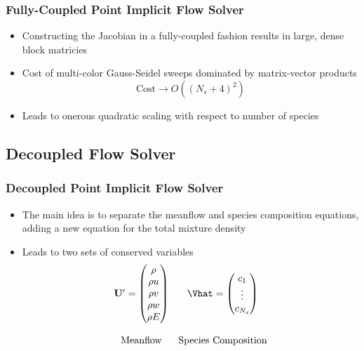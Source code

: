 \documentclass{beamer}
\begin{document}
\begin{frame}
  \frametitle{Fully-Coupled Point Implicit Flow Solver}
  \begin{itemize}
    \item Constructing the Jacobian in a fully-coupled fashion results in large,
      dense block matricies
    \item Cost of multi-color Gauss-Seidel sweeps dominated by matrix-vector
      products 
      \[
        \text{Cost} \to O((N_s + 4)^2)
      \]
    \item Leads to onerous quadratic scaling with respect to number of species
  \end{itemize}
\end{frame}

\subsection{Decoupled Flow Solver}

\begin{frame}
  \frametitle{Decoupled Point Implicit Flow Solver}
  \begin{itemize}
    \item The main idea is to separate the meanflow and species composition
      equations, adding a new equation for the total mixture density
    \item Leads to two sets of conserved variables
      \begin{equation*}
      	\begin{matrix}
      		\Up =\begin{pmatrix}
      			\rho \\
      			\rho u \\
      			\rho v \\
      			\rho w \\
      			\rho E
      		\end{pmatrix} &
      		\Vhat = \begin{pmatrix}
      			c_1 \\
      			\vdots \\
      			c_{N_s}
      		\end{pmatrix} \\ \\
          \text{Meanflow} & \text{Species Composition}
      	\end{matrix} 
      \end{equation*}
  \end{itemize}
\end{frame}
\end{document}

